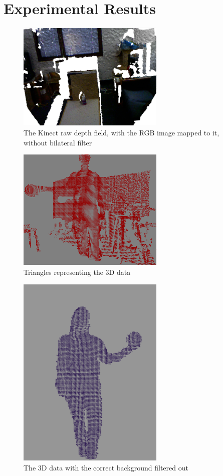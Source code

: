 \documentclass[pdftex,10.5pt]{report}
\begin{document}
\section{Experimental Results}

\begin{figure}[H]
	\centering
	\includegraphics[width=70mm]{figures/kinectwaterbottle.png}
	\caption{The Kinect raw depth field, with the RGB image mapped to it, without bilateral filter}
	\label{waterbot}
\end{figure}

\begin{figure}[H]
	\centering
	\includegraphics[width=70mm]{figures/3dtriangles.png}
	\caption{Triangles representing the 3D data}
	\label{3dtri}
\end{figure}

\begin{figure}[H]
	\centering
	\includegraphics[width=70mm]{figures/cadyholdingball.png}
	\caption{The 3D data with the correct background filtered out}
	\label{balls2}
\end{figure}
\end{document}
